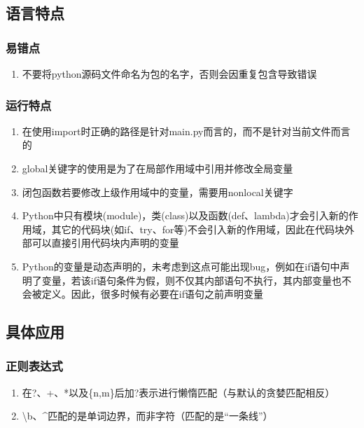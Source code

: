 \documentclass[onecolumn]{article}
\begin{document}
    \subsection{语言特点}
        \subsubsection{易错点}
            \noindent
            \begin{enumerate}
                \item 不要将python源码文件命名为包的名字，否则会因重复包含导致错误
            \end{enumerate}
        \subsubsection{运行特点}
            \noindent
            \begin{enumerate}
                \item 在使用import时正确的路径是针对main.py而言的，而不是针对当前文件而言的
                \item global关键字的使用是为了在局部作用域中引用并修改全局变量
                \item 闭包函数若要修改上级作用域中的变量，需要用nonlocal关键字
                \item Python中只有模块(module)，类(class)以及函数(def、lambda)才会引入新的作用域，其它的代码块(如if、try、for等)不会引入新的作用域，因此在代码块外部可以直接引用代码块内声明的变量
                \item Python的变量是动态声明的，未考虑到这点可能出现bug，例如在if语句中声明了变量，若该if语句条件为假，则不仅其内部语句不执行，其内部变量也不会被定义。因此，很多时候有必要在if语句之前声明变量
            \end{enumerate}
    \subsection{具体应用}
        \subsubsection{正则表达式}
            \noindent
            \begin{enumerate}
                \item 在?、+、*以及\{n,m\}后加?表示进行懒惰匹配（与默认的贪婪匹配相反）
                \item \textbackslash b、\^{}匹配的是单词边界，而非字符（匹配的是“一条线”）
            \end{enumerate}
\newpage
\end{document}
